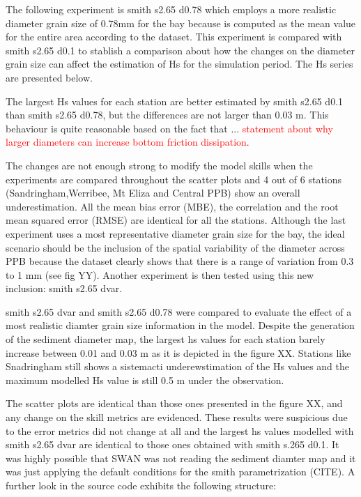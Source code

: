 \documentclass[12pt]{article}
\begin{document}
The following experiment is smith s2.65 d0.78 which employs a more realistic diameter grain size of 0.78mm for the bay because is computed as the mean value for the entire area according to the dataset. This experiment is compared with smith s2.65 d0.1 to stablish a comparison about how the changes on the diameter grain size can affect the estimation of Hs for the simulation period. The Hs series are presented below.

The largest Hs values for each station are better estimated by smith s2.65 d0.1 than smith s2.65 d0.78, but the differences are not larger than 0.03 m. This behaviour is quite reasonable based on the fact that ... \textcolor{red}{statement about why larger diameters can increase bottom friction dissipation}.

The changes are not enough strong to modify the model skills when the experiments are compared throughout the scatter plots and 4 out of 6 stations (Sandringham,Werribee, Mt Eliza and Central PPB) show an overall underestimation. All the mean bias error (MBE), the correlation and the root mean squared error (RMSE) are identical for all the stations. Although the last experiment uses a most representative diameter grain size for the bay, the ideal scenario should be the inclusion of the spatial variability of the diameter across PPB because the dataset clearly shows that there is a range of variation from 0.3 to 1 mm (see fig YY). Another experiment is then tested using this new inclusion: smith s2.65 dvar.

smith s2.65 dvar and smith s2.65 d0.78 were compared to evaluate the effect of a most realistic diamter grain size information in the model. Despite the generation of the sediment diameter map, the largest hs values for each station barely increase between 0.01 and 0.03 m as it is depicted in the figure XX. Stations like Snadringham still shows a sistemacti underewstimation of the Hs values and the maximum modelled Hs value is still 0.5 m under the observation. 

The scatter plots are identical than those ones presented in the figure XX, and any change on the skill metrics are evidenced. These results were suspicious due to the error metrics did not change at all and the largest hs values modelled with smith s2.65 dvar are identical to those ones obtained with smith s.265 d0.1. It was highly possible that SWAN was not reading the sediment diamter map and it was just applying the default conditions for the smith parametrization (CITE). A further look in the source code exhibits the following structure:
\end{document}
